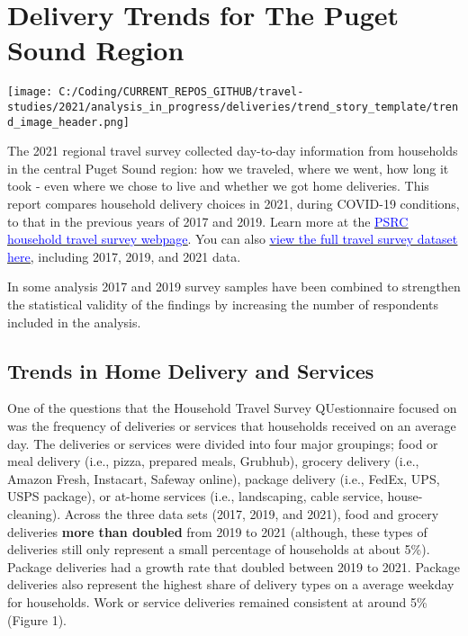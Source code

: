 \documentclass[
  11pt,
]{article}
\author{Meg Grzybowski}
\date{2023-3-7}
\begin{document}
\setmainfont{Poppins}


\hypertarget{delivery-trends-for-the-puget-sound-region}{%
\section{Delivery Trends for The Puget Sound
Region}\label{delivery-trends-for-the-puget-sound-region}}

\texttt{[image: C:/Coding/CURRENT\_REPOS\_GITHUB/travel-studies/2021/analysis\_in\_progress/deliveries/trend\_story\_template/trend\_image\_header.png]}

\begin{flushleft}
The 2021 regional travel survey collected day-to-day information from households in the central Puget Sound region: how we traveled, where we went, how long it took - even where we chose to live and whether we got home deliveries. This report compares household delivery choices in 2021, during COVID-19 conditions, to that in the previous years of 2017 and 2019. Learn more at the \href{https://www.psrc.org/our-work/household-travel-survey-program}{\underline{\textcolor{blue}{PSRC household travel survey webpage}}}. You can also \href{https://household-travel-survey-psregcncl.hub.arcgis.com}{\underline{\textcolor{blue}{view the full travel survey dataset here}}}, including 2017, 2019, and 2021 data.

In some analysis 2017 and 2019 survey samples have been combined to strengthen the statistical validity of the findings by increasing the number of respondents included in the analysis.
\end{flushleft}

\hypertarget{trends-in-home-delivery-and-services}{%
\subsection{Trends in Home Delivery and
Services}\label{trends-in-home-delivery-and-services}}

\begin{flushleft}
One of the questions that the Household Travel Survey QUestionnaire focused on was the frequency of deliveries or services that households received on an average day. The deliveries or services were divided into four major groupings; food or meal delivery (i.e., pizza, prepared meals, Grubhub), grocery delivery (i.e., Amazon Fresh, Instacart, Safeway online), package delivery (i.e., FedEx, UPS, USPS package), or at-home services (i.e., landscaping, cable service, house-cleaning). Across the three data sets (2017, 2019, and 2021), food and grocery deliveries \textbf{more than doubled} from 2019 to 2021 (although, these types of deliveries still only represent a small percentage of households at about 5\%). Package deliveries had a growth rate that doubled between 2019 to 2021. Package deliveries also represent the highest share of delivery types on a average weekday for households. Work or service deliveries remained consistent at around 5\% (Figure 1).
\end{flushleft}
\end{document}

